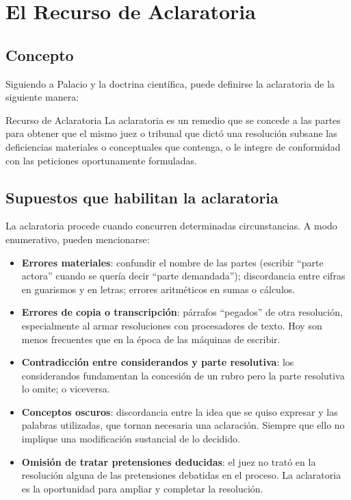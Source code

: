 \documentclass[12pt,oneside]{book}
\begin{document}

\chapter{El Recurso de Aclaratoria}

\section{Concepto}

Siguiendo a Palacio y la doctrina científica, puede definirse la aclaratoria de la siguiente manera:

\begin{definition}{Recurso de Aclaratoria}
La aclaratoria es un remedio que se concede a las partes para obtener que el mismo juez o tribunal que dictó una resolución subsane las deficiencias materiales o conceptuales que contenga, o le integre de conformidad con las peticiones oportunamente formuladas.
\end{definition}

\section{Supuestos que habilitan la aclaratoria}

La aclaratoria procede cuando concurren determinadas circunstancias. A modo enumerativo, pueden mencionarse:

\begin{itemize}
    \item \textbf{Errores materiales}: confundir el nombre de las partes (escribir ``parte actora'' cuando se quería decir ``parte demandada''); discordancia entre cifras en guarismos y en letras; errores aritméticos en sumas o cálculos.
    
    \item \textbf{Errores de copia o transcripción}: párrafos ``pegados'' de otra resolución, especialmente al armar resoluciones con procesadores de texto. Hoy son menos frecuentes que en la época de las máquinas de escribir.
    
    \item \textbf{Contradicción entre considerandos y parte resolutiva}: los considerandos fundamentan la concesión de un rubro pero la parte resolutiva lo omite; o viceversa.
    
    \item \textbf{Conceptos oscuros}: discordancia entre la idea que se quiso expresar y las palabras utilizadas, que tornan necesaria una aclaración. Siempre que ello no implique una modificación sustancial de lo decidido.
    
    \item \textbf{Omisión de tratar pretensiones deducidas}: el juez no trató en la resolución alguna de las pretensiones debatidas en el proceso. La aclaratoria es la oportunidad para ampliar y completar la resolución.
\end{itemize}
\end{document}
